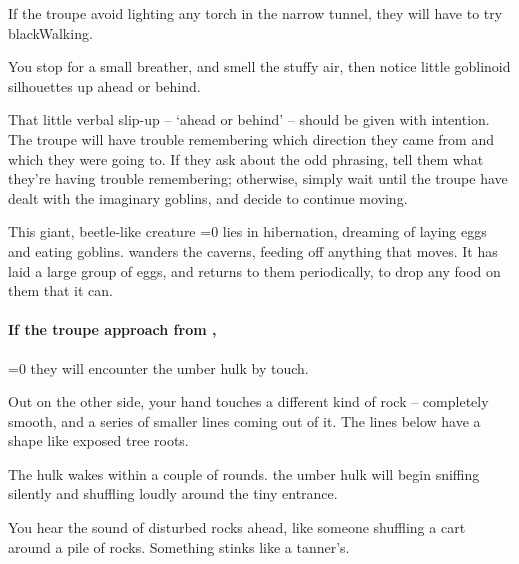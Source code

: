 \begin{multicols}{2}
If the troupe avoid lighting any torch in the narrow tunnel, they will have to try \gls{blackWalking}.

\begin{boxtext}
  You stop for a small breather, and smell the stuffy air, then notice little goblinoid silhouettes up ahead or behind.
\end{boxtext}

That little verbal slip-up -- `ahead or behind' -- should be given with intention.
The troupe will have trouble remembering which direction they came from and which they were going to.
If they ask about the odd phrasing, tell them what they're having trouble remembering; otherwise, simply wait until the troupe have dealt with the imaginary goblins, and decide to continue moving.



\begin{exampletext}
  This giant, beetle-like creature%
  \ifnum\value{temperature}=0
    lies in hibernation, dreaming of laying eggs and eating goblins.
  \else
    wanders the caverns, feeding off anything that moves.
    It has laid a large group of eggs, and returns to them periodically, to drop any food on them that it can.
  \fi
\end{exampletext}

\paragraph{If the troupe approach from ,}
\ifnum\value{temperature}=0
  they will encounter the umber hulk by touch.

  \begin{boxtext}
    Out on the other side, your hand touches a different kind of rock -- completely smooth, and a series of smaller lines coming out of it.
    The lines below have a shape like exposed tree roots.
  \end{boxtext}

  The hulk wakes within a couple of \glspl{round}.
\else
  the umber hulk will begin sniffing silently and shuffling loudly around the tiny entrance.

  \begin{boxtext}
    You hear the sound of disturbed rocks ahead, like someone shuffling a cart around a pile of rocks.
    Something stinks like a tanner's.
  \end{boxtext}
\fi


\end{multicols}
